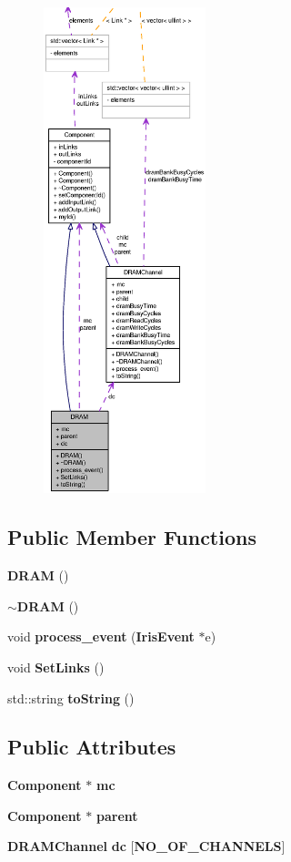 \begin{figure}[H]
\begin{center}
\leavevmode
\includegraphics[height=400pt]{classDRAM__coll__graph}
\end{center}
\end{figure}
\subsection*{Public Member Functions}
\begin{CompactItemize}
\item 
{\bf DRAM} ()
\item 
{\bf $\sim$DRAM} ()
\item 
void {\bf process\_\-event} ({\bf IrisEvent} $\ast$e)
\item 
void {\bf SetLinks} ()
\item 
std::string {\bf toString} ()
\end{CompactItemize}
\subsection*{Public Attributes}
\begin{CompactItemize}
\item 
{\bf Component} $\ast$ {\bf mc}
\item 
{\bf Component} $\ast$ {\bf parent}
\item 
{\bf DRAMChannel} {\bf dc} [{\bf NO\_\-OF\_\-CHANNELS}]
\end{CompactItemize}


